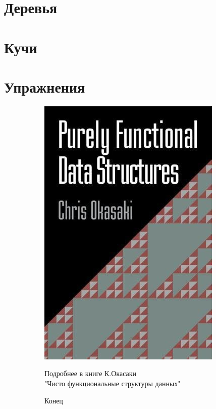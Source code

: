 \documentclass[aspectratio=169
  , xcolor={svgnames}
  , hyperref=
      { colorlinks
      , urlcolor=DarkBlue 
      }  
  , russian  %
  ]{beamer}
\theoremstyle{exerciseStyle1}
\begin{document}
\section{Деревья}



\section{Кучи}


%

\section{Упражнения}



\begin{frame}
\begin{figure}[ht]
\begin{subfigure}{.4\textwidth}
  \includegraphics[scale=0.5]{okasaki_cover.jpg}
\end{subfigure}
\begin{subfigure}{.55\textwidth}
\begin{center}
  Подробнее в книге К.Окасаки \\"Чисто функциональные структуры данных" \\
  \vspace{6em}
    
  {\Huge Конец}
\end{center}
\end{subfigure}
\end{figure}
\end{frame}
\end{document}
